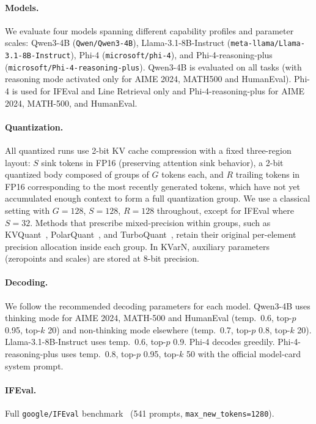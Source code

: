 \documentclass{llmxive}
\begin{document}
\paragraph{Models.}
We evaluate four models spanning different capability profiles and parameter scales: Qwen3-4B (\texttt{Qwen/Qwen3-4B}), Llama-3.1-8B-Instruct (\texttt{meta-llama/Llama-3.1-8B-Instruct}), Phi-4 (\texttt{microsoft/phi-4}), and Phi-4-reasoning-plus (\texttt{microsoft/Phi-4-reasoning-plus}). Qwen3-4B is evaluated on all tasks (with reasoning mode activated only for AIME 2024, MATH500 and HumanEval). \hbox{Phi-4} is used for IFEval and Line Retrieval only and Phi-4-reasoning-plus for AIME 2024, MATH-500, and HumanEval.

\paragraph{Quantization.}
All quantized runs use 2-bit KV cache compression with a fixed three-region layout: $S$ sink tokens in FP16 (preserving attention sink behavior), a 2-bit quantized body composed of groups of $G$ tokens each, and $R$ trailing tokens in FP16 corresponding to the most recently generated tokens, which have not yet accumulated enough context to form a full quantization group. We use a classical setting with $G{=}128$, $S{=}128$, $R{=}128$ throughout, except for IFEval where $S{=}32$. Methods that prescribe mixed-precision within groups, such as KVQuant~\citep{hooper2024kvquant}, PolarQuant~\citep{wu2026polarquant}, and TurboQuant~\citep{zandieh2026turboquant}, retain their original per-element precision allocation inside each group. In KVarN, auxiliary parameters (zeropoints and scales) are stored at 8-bit precision.


\paragraph{Decoding.}
We follow the recommended decoding parameters for each model. Qwen3-4B uses thinking mode for AIME 2024, MATH-500 and HumanEval (temp.\ 0.6, top-$p$ 0.95, top-$k$ 20) and non-thinking mode elsewhere (temp.\ 0.7, top-$p$ 0.8, top-$k$ 20). Llama-3.1-8B-Instruct uses temp.\ 0.6, top-$p$ 0.9. Phi-4 decodes greedily. Phi-4-reasoning-plus uses temp.\ 0.8, top-$p$ 0.95, top-$k$ 50 with the official model-card system prompt.

\paragraph{IFEval.}
Full \texttt{google/IFEval} benchmark~\citep{zhou2023instructionfollowingevaluationlargelanguage_ifeval} (541 prompts, \texttt{max\_new\_tokens=1280}).
\end{document}
